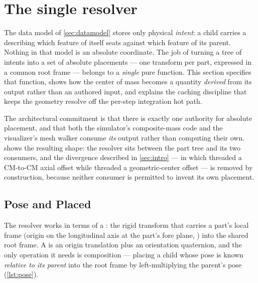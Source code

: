 \section{The single resolver}\label{sec:resolver}

The data model of \cref{sec:datamodel} stores only physical \emph{intent}: a child carries a
 describing which feature of itself seats against which feature of its parent.
Nothing in that model is an absolute coordinate. The job of turning a tree of intents into a set of
absolute placements --- one transform per part, expressed in a common root frame --- belongs to a
\emph{single} pure function. This section specifies that function, shows how the center of mass
becomes a quantity \emph{derived} from its output rather than an authored input, and explains the
caching discipline that keeps the geometry resolve off the per-step integration hot path.

The architectural commitment is that there is exactly one authority for absolute placement, and that
both the simulator's composite-mass code and the visualizer's mesh walker consume \emph{its} output
rather than computing their own.  shows the resulting shape: the resolver sits
between the part tree and its two consumers, and the divergence described in \cref{sec:intro} --- in
which  threaded a CM-to-CM axial offset while
 threaded a geometric-center offset --- is removed by
construction, because neither consumer is permitted to invent its own placement.


\subsection{Pose and Placed}

The resolver works in terms of a : the rigid transform that carries a part's local frame
(origin on the longitudinal axis at the part's fore plane, \zfwd) into the shared root frame. A
 is an origin translation plus an orientation quaternion, and the only operation it needs
is composition --- placing a child whose pose is known \emph{relative to its parent} into the root
frame by left-multiplying the parent's pose (\cref{lst:pose}).

